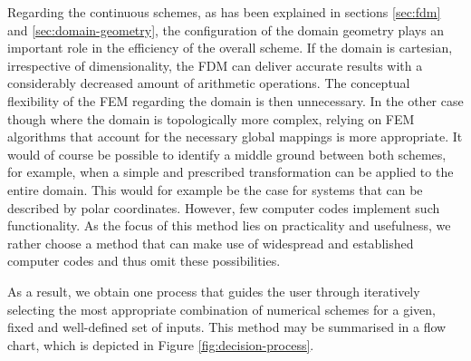 \documentclass[asi,article,submit,moreauthors]{Definitions/mdpi}
\begin{document}
Regarding the continuous schemes, as has been explained in sections \ref{sec:fdm} and \ref{sec:domain-geometry}, the configuration of the domain geometry plays an important role in the efficiency of the overall scheme.
If the domain is cartesian, irrespective of dimensionality, the FDM can deliver accurate results with a considerably decreased amount of arithmetic operations.
The conceptual flexibility of the FEM regarding the domain is then unnecessary.
In the other case though where the domain is topologically more complex, relying on FEM algorithms that account for the necessary global mappings is more appropriate.
It would of course be possible to identify a middle ground between both schemes, for example, when a simple and prescribed transformation can be applied to the entire domain.
This would for example be the case for systems that can be described by polar coordinates.
However, few computer codes implement such functionality.
As the focus of this method lies on practicality and usefulness, we rather choose a method that can make use of widespread and established computer codes and thus omit these possibilities.

As a result, we obtain one process that guides the user through iteratively selecting the most appropriate combination of numerical schemes for a given, fixed and well-defined set of inputs.
This method may be summarised in a flow chart, which is depicted in Figure \ref{fig:decision-process}.
\end{document}
